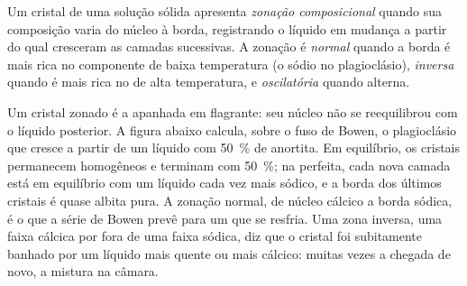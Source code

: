 \begin{definition}\label{def:b2:magmatic-differentiation:zoning}
Um cristal de uma solução sólida apresenta \emph{zonação composicional}
quando sua composição varia do núcleo à borda, registrando o líquido em mudança
a partir do qual cresceram as camadas sucessivas. A zonação é \emph{normal} quando a borda é mais rica
no componente de baixa temperatura (o sódio no plagioclásio), \emph{inversa} quando é
mais rica no de alta temperatura, e \emph{oscilatória} quando alterna.
\end{definition}

Um cristal zonado é a  apanhada em flagrante: seu núcleo não se
reequilibrou com o líquido posterior. A figura abaixo calcula, sobre o fuso de Bowen,
o plagioclásio que cresce a partir de um líquido com \qty{50}{\percent} de anortita. Em
equilíbrio, os cristais permanecem homogêneos e terminam com \qty{50}{\percent}; na  perfeita, cada nova camada está em equilíbrio com um líquido cada vez mais sódico,
e a borda dos últimos cristais é quase albita pura. A zonação normal, de
núcleo cálcico a borda sódica, é o que a série de Bowen prevê para um  que se resfria. Uma zona
inversa, uma faixa cálcica por fora de uma faixa sódica, diz que o cristal foi subitamente banhado por
um líquido mais quente ou mais cálcico: muitas vezes a chegada de  novo, a mistura na
câmara.

